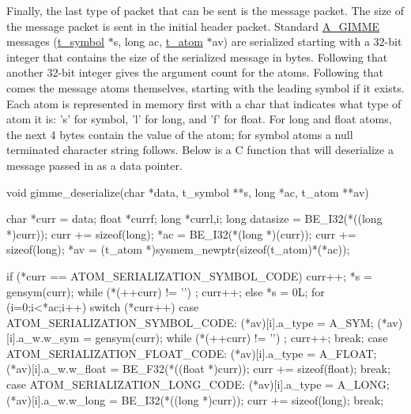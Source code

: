 Finally, the last type of packet that can be sent is the message packet. The size of the message packet is sent in the initial header packet. Standard \hyperlink{group__atom_gga8aa6700e9f00b132eb376db6e39ade47a81c1a8550f038db16a619167a70a79b6}{A\_\-GIMME} messages (\hyperlink{structt__symbol}{t\_\-symbol} $\ast$s, long ac, \hyperlink{structt__atom}{t\_\-atom} $\ast$av) are serialized starting with a 32-\/bit integer that contains the size of the serialized message in bytes. Following that another 32-\/bit integer gives the argument count for the atoms. Following that comes the message atoms themselves, starting with the leading symbol if it exists. Each atom is represented in memory first with a char that indicates what type of atom it is: 's' for symbol, 'l' for long, and 'f' for float. For long and float atoms, the next 4 bytes contain the value of the atom; for symbol atoms a null terminated character string follows. Below is a C function that will deserialize a message passed in as a data pointer.


\begin{DoxyCode}
void gimme_deserialize(char *data, t_symbol **s, long *ac, t_atom **av)
{
   char *curr = data;
   float *currf;
   long *currl,i;
   long datasize = BE_I32(*((long *)curr));
   curr += sizeof(long);   
   *ac = BE_I32(*(long *)(curr));
   curr += sizeof(long);
   *av = (t_atom *)sysmem_newptr(sizeof(t_atom)*(*ac));

   if (*curr == ATOM_SERIALIZATION_SYMBOL_CODE)
   {
      curr++;
      *s = gensym(curr);
      while (*(++curr) != '\0') ;
      curr++;
   }
   else
      *s = 0L;
   for (i=0;i<*ac;i++)
      switch (*curr++)
      {
         case ATOM_SERIALIZATION_SYMBOL_CODE:
            (*av)[i].a_type = A_SYM;
            (*av)[i].a_w.w_sym = gensym(curr);
            while (*(++curr) != '\0') ;
            curr++;
            break;
         case ATOM_SERIALIZATION_FLOAT_CODE:
            (*av)[i].a_type = A_FLOAT;
            (*av)[i].a_w.w_float = BE_F32(*((float *)curr));
            curr += sizeof(float);
            break;
         case ATOM_SERIALIZATION_LONG_CODE:
            (*av)[i].a_type = A_LONG;
            (*av)[i].a_w.w_long = BE_I32(*((long *)curr));
            curr += sizeof(long);
            break;
      }
}
\end{DoxyCode}
 
